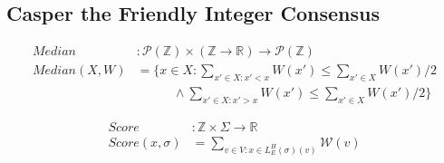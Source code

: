 \subsection{Casper the Friendly Integer Consensus}


\iffalse
\begin{defn}[Weight Less Than x]
\begin{align*}
WLX:& \mathbb{Z} \times \mathcal{P}_{fin}(\mathbb{Z}) \times (\mathbb{Z} \to \mathbb{R}) \to \mathbb{R} \\
WLX(x, X, W) =& \sum_{x' \in X : x' < x} W(x')
\end{align*}
\end{defn}

\begin{defn}[Weight Greater Than x]
\begin{align*}
WLX:& \mathbb{Z} \times \mathcal{P}_{fin}(\mathbb{Z}) \times (\mathbb{Z} \to \mathbb{R}) \to \mathbb{R} \\
WGX(x, X, W) =& \sum_{x' \in X : x' > x} W(x')
\end{align*}
\end{defn}

\begin{defn}[Weighted Median]
\begin{align*}
Median &: \mathcal{P}(\mathbb{Z}) \times (\mathbb{Z}\to \mathbb{R}) \to \mathcal{P}(\mathbb{Z}) \\
Median(X, W) &= \{x \in X : WLX(x, X, W) \leq \sum_{x' \in X} W(x')/2 \\
&~~~~~~~~~~~~~\land WGX(x, X, W) \leq \sum_{x' \in X} W(x')/2\}
\end{align*}
\end{defn}
\fi

\begin{defn}
\begin{align*}
Median &: \mathcal{P}(\mathbb{Z}) \times (\mathbb{Z}\to \mathbb{R}) \to \mathcal{P}(\mathbb{Z}) \\
Median(X, W) &= \{x \in X :  \sum_{x' \in X : x' < x} W(x') \leq \sum_{x' \in X} W(x')/2 \\
&~~~~~~~~~~~~~\land \sum_{x' \in X : x' > x} W(x') \leq \sum_{x' \in X} W(x')/2\}
\end{align*}
\end{defn}

\begin{defn}[Score]
\begin{align*}
Score &: \mathbb{Z} \times \Sigma \to \mathbb{R} \\
Score(x, \sigma) &= \sum_{v \in V: x \in L^H_E(\sigma)(v)} \mathcal{W}(v)
\end{align*}
\end{defn}


